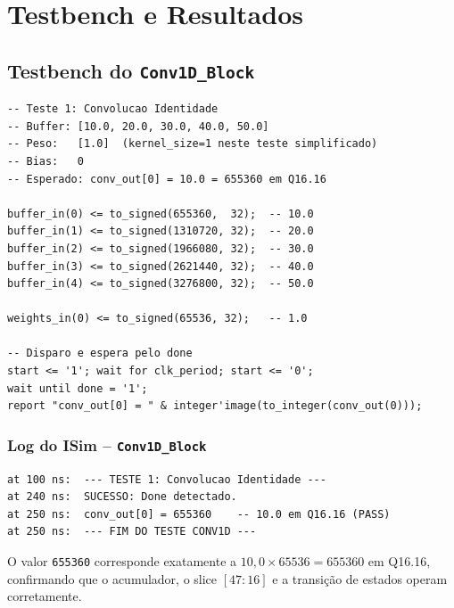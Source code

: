 \documentclass[a4paper,12pt]{article}
\begin{document}
\section{Testbench e Resultados}

\subsection{Testbench do \texttt{Conv1D\_Block}}

\begin{lstlisting}[style=vhdlstyle,
    caption={Testbench do \texttt{Conv1D\_Block} -- convoluc\c{c}\~ao identidade.},
    label={lst:tb_conv1d}]
-- Teste 1: Convolucao Identidade
-- Buffer: [10.0, 20.0, 30.0, 40.0, 50.0]
-- Peso:   [1.0]  (kernel_size=1 neste teste simplificado)
-- Bias:   0
-- Esperado: conv_out[0] = 10.0 = 655360 em Q16.16

buffer_in(0) <= to_signed(655360,  32);  -- 10.0
buffer_in(1) <= to_signed(1310720, 32);  -- 20.0
buffer_in(2) <= to_signed(1966080, 32);  -- 30.0
buffer_in(3) <= to_signed(2621440, 32);  -- 40.0
buffer_in(4) <= to_signed(3276800, 32);  -- 50.0

weights_in(0) <= to_signed(65536, 32);   -- 1.0

-- Disparo e espera pelo done
start <= '1'; wait for clk_period; start <= '0';
wait until done = '1';
report "conv_out[0] = " & integer'image(to_integer(conv_out(0)));
\end{lstlisting}

\subsubsection{Log do ISim -- \texttt{Conv1D\_Block}}

\begin{lstlisting}[style=logstyle,
    caption={Sa\'ida do ISim para o testbench do \texttt{Conv1D\_Block}.},
    label={lst:log_conv1d}]
at 100 ns:  --- TESTE 1: Convolucao Identidade ---
at 240 ns:  SUCESSO: Done detectado.
at 250 ns:  conv_out[0] = 655360    -- 10.0 em Q16.16 (PASS)
at 250 ns:  --- FIM DO TESTE CONV1D ---
\end{lstlisting}

O valor \texttt{655360} corresponde exatamente a $10{,}0 \times 65536 = 655360$ em Q16.16, confirmando que o acumulador, o slice $[47\!:\!16]$ e a transi\c{c}\~ao de estados operam corretamente.
\end{document}
